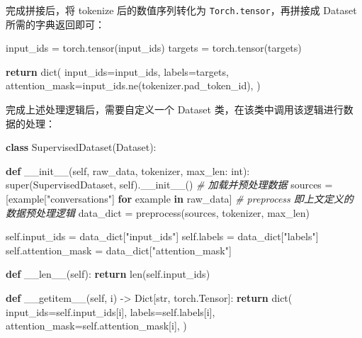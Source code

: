 \documentclass[
]{article}
\newenvironment{Shaded}{}{}
\newcommand{\BuiltInTok}[1]{\textcolor[rgb]{0.00,0.50,0.00}{#1}}
\newcommand{\CommentTok}[1]{\textcolor[rgb]{0.38,0.63,0.69}{\textit{#1}}}
\newcommand{\ControlFlowTok}[1]{\textcolor[rgb]{0.00,0.44,0.13}{\textbf{#1}}}
\newcommand{\FunctionTok}[1]{\textcolor[rgb]{0.02,0.16,0.49}{#1}}
\newcommand{\KeywordTok}[1]{\textcolor[rgb]{0.00,0.44,0.13}{\textbf{#1}}}
\newcommand{\NormalTok}[1]{#1}
\newcommand{\OperatorTok}[1]{\textcolor[rgb]{0.40,0.40,0.40}{#1}}
\newcommand{\StringTok}[1]{\textcolor[rgb]{0.25,0.44,0.63}{#1}}
\newcommand{\VariableTok}[1]{\textcolor[rgb]{0.10,0.09,0.49}{#1}}
\begin{document}
完成拼接后，将 tokenize 后的数值序列转化为
\texttt{Torch.tensor}，再拼接成 Dataset 所需的字典返回即可：

\begin{Shaded}
\begin{Highlighting}[]
\NormalTok{input\_ids }\OperatorTok{=}\NormalTok{ torch.tensor(input\_ids)}
\NormalTok{targets }\OperatorTok{=}\NormalTok{ torch.tensor(targets)}

\ControlFlowTok{return} \BuiltInTok{dict}\NormalTok{(}
\NormalTok{    input\_ids}\OperatorTok{=}\NormalTok{input\_ids,}
\NormalTok{    labels}\OperatorTok{=}\NormalTok{targets,}
\NormalTok{    attention\_mask}\OperatorTok{=}\NormalTok{input\_ids.ne(tokenizer.pad\_token\_id),}
\NormalTok{)}
\end{Highlighting}
\end{Shaded}

完成上述处理逻辑后，需要自定义一个 Dataset
类，在该类中调用该逻辑进行数据的处理：

\begin{Shaded}
\begin{Highlighting}[]
\KeywordTok{class}\NormalTok{ SupervisedDataset(Dataset):}

    \KeywordTok{def} \FunctionTok{\_\_init\_\_}\NormalTok{(}\VariableTok{self}\NormalTok{, raw\_data, tokenizer, max\_len: }\BuiltInTok{int}\NormalTok{):}
        \BuiltInTok{super}\NormalTok{(SupervisedDataset, }\VariableTok{self}\NormalTok{).}\FunctionTok{\_\_init\_\_}\NormalTok{()}
        \CommentTok{\# 加载并预处理数据}
\NormalTok{        sources }\OperatorTok{=}\NormalTok{ [example[}\StringTok{"conversations"}\NormalTok{] }\ControlFlowTok{for}\NormalTok{ example }\KeywordTok{in}\NormalTok{ raw\_data]}
        \CommentTok{\# preprocess 即上文定义的数据预处理逻辑}
\NormalTok{        data\_dict }\OperatorTok{=}\NormalTok{ preprocess(sources, tokenizer, max\_len)}

        \VariableTok{self}\NormalTok{.input\_ids }\OperatorTok{=}\NormalTok{ data\_dict[}\StringTok{"input\_ids"}\NormalTok{]}
        \VariableTok{self}\NormalTok{.labels }\OperatorTok{=}\NormalTok{ data\_dict[}\StringTok{"labels"}\NormalTok{]}
        \VariableTok{self}\NormalTok{.attention\_mask }\OperatorTok{=}\NormalTok{ data\_dict[}\StringTok{"attention\_mask"}\NormalTok{]}

    \KeywordTok{def} \FunctionTok{\_\_len\_\_}\NormalTok{(}\VariableTok{self}\NormalTok{):}
        \ControlFlowTok{return} \BuiltInTok{len}\NormalTok{(}\VariableTok{self}\NormalTok{.input\_ids)}

    \KeywordTok{def} \FunctionTok{\_\_getitem\_\_}\NormalTok{(}\VariableTok{self}\NormalTok{, i) }\OperatorTok{{-}\textgreater{}}\NormalTok{ Dict[}\BuiltInTok{str}\NormalTok{, torch.Tensor]:}
        \ControlFlowTok{return} \BuiltInTok{dict}\NormalTok{(}
\NormalTok{            input\_ids}\OperatorTok{=}\VariableTok{self}\NormalTok{.input\_ids[i],}
\NormalTok{            labels}\OperatorTok{=}\VariableTok{self}\NormalTok{.labels[i],}
\NormalTok{            attention\_mask}\OperatorTok{=}\VariableTok{self}\NormalTok{.attention\_mask[i],}
\NormalTok{        )}
\end{Highlighting}
\end{Shaded}
\end{document}
